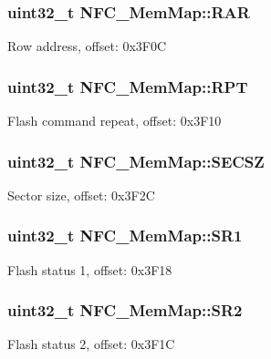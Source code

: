 \subsubsection[{R\+A\+R}]{\setlength{\rightskip}{0pt plus 5cm}uint32\+\_\+t N\+F\+C\+\_\+\+Mem\+Map\+::\+R\+A\+R}\label{struct_n_f_c___mem_map_a3f377c9911d9d67731bb4df00fdfd4ce}
Row address, offset\+: 0x3\+F0\+C \hypertarget{struct_n_f_c___mem_map_a04979c6bc6304d65c8eb943a841f147a}{}
\subsubsection[{R\+P\+T}]{\setlength{\rightskip}{0pt plus 5cm}uint32\+\_\+t N\+F\+C\+\_\+\+Mem\+Map\+::\+R\+P\+T}\label{struct_n_f_c___mem_map_a04979c6bc6304d65c8eb943a841f147a}
Flash command repeat, offset\+: 0x3\+F10 \hypertarget{struct_n_f_c___mem_map_a8263ed8790e41b153858d933ec8c7fef}{}
\subsubsection[{S\+E\+C\+S\+Z}]{\setlength{\rightskip}{0pt plus 5cm}uint32\+\_\+t N\+F\+C\+\_\+\+Mem\+Map\+::\+S\+E\+C\+S\+Z}\label{struct_n_f_c___mem_map_a8263ed8790e41b153858d933ec8c7fef}
Sector size, offset\+: 0x3\+F2\+C \hypertarget{struct_n_f_c___mem_map_aa8cce6d11c86d6e15a8dcb5df513627e}{}
\subsubsection[{S\+R1}]{\setlength{\rightskip}{0pt plus 5cm}uint32\+\_\+t N\+F\+C\+\_\+\+Mem\+Map\+::\+S\+R1}\label{struct_n_f_c___mem_map_aa8cce6d11c86d6e15a8dcb5df513627e}
Flash status 1, offset\+: 0x3\+F18 \hypertarget{struct_n_f_c___mem_map_ac3b02492f50adbb1ec4c964536f627b6}{}
\subsubsection[{S\+R2}]{\setlength{\rightskip}{0pt plus 5cm}uint32\+\_\+t N\+F\+C\+\_\+\+Mem\+Map\+::\+S\+R2}\label{struct_n_f_c___mem_map_ac3b02492f50adbb1ec4c964536f627b6}
Flash status 2, offset\+: 0x3\+F1\+C \hypertarget{struct_n_f_c___mem_map_acb4d1261ff3c34b54bc5c14496f742ac}{}
